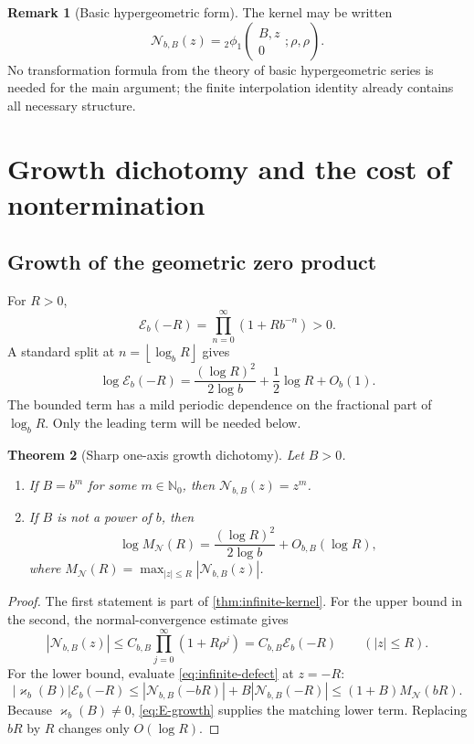 \documentclass[11pt]{article}
\newtheorem{theorem}{Theorem}[section]
\theoremstyle{definition}
\newtheorem{remark}[theorem]{Remark}
\newcommand{\Nker}{\mathscr{N}}
\newcommand{\Eker}{\mathscr{E}}
\newcommand{\kk}{\varkappa}
\newcommand{\N}{\mathbb{N}}
\newcommand{\floor}[1]{\left\lfloor #1\right\rfloor}
\begin{document}
\begin{remark}[Basic hypergeometric form]
The kernel may be written
\[
 \Nker_{b,B}(z)={}_2\phi_1\!\left(
 \begin{matrix}B,z\\0\end{matrix};\rho,\rho\right).
\]
No transformation formula from the theory of basic hypergeometric series is needed for the main argument; the finite interpolation identity already contains all necessary structure.
\end{remark}

\section{Growth dichotomy and the cost of nontermination}

\subsection{Growth of the geometric zero product}

For $R>0$,
\[
 \Eker_b(-R)=\prod_{n=0}^{\infty}(1+Rb^{-n})>0.
\]
A standard split at $n=\floor{\log_bR}$ gives
\begin{equation}\label{eq:E-growth}
 \log \Eker_b(-R)
 =\frac{(\log R)^2}{2\log b}+\frac12\log R+O_b(1).
\end{equation}
The bounded term has a mild periodic dependence on the fractional part of $\log_bR$.  Only the leading term will be needed below.

\begin{theorem}[Sharp one-axis growth dichotomy]\label{thm:growth-dichotomy}
Let $B>0$.
\begin{enumerate}
  \item If $B=b^m$ for some $m\in\N_0$, then $\Nker_{b,B}(z)=z^m$.
  \item If $B$ is not a power of $b$, then
  \begin{equation}\label{eq:N-growth}
   \log M_{\Nker}(R)
   =\frac{(\log R)^2}{2\log b}+O_{b,B}(\log R),
  \end{equation}
  where $M_{\Nker}(R)=\max_{|z|\le R}|\Nker_{b,B}(z)|$.
\end{enumerate}
\end{theorem}

\begin{proof}
The first statement is part of \cref{thm:infinite-kernel}.  For the upper bound in the second, the normal-convergence estimate gives
\[
 |\Nker_{b,B}(z)|
 \le C_{b,B}\prod_{j=0}^{\infty}(1+R\rho^j)
 =C_{b,B}\Eker_b(-R)
 \qquad (|z|\le R).
\]
For the lower bound, evaluate \eqref{eq:infinite-defect} at $z=-R$:
\[
 |\kk_b(B)|\Eker_b(-R)
 \le |\Nker_{b,B}(-bR)|+B|\Nker_{b,B}(-R)|
 \le(1+B)M_{\Nker}(bR).
\]
Because $\kk_b(B)\ne0$, \eqref{eq:E-growth} supplies the matching lower term.  Replacing $bR$ by $R$ changes only $O(\log R)$.
\end{proof}
\end{document}
